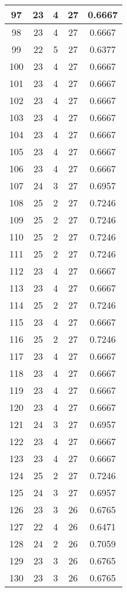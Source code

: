 \documentclass[letterpaper, 12pt]{article}
\begin{document}
\begin{longtable}{|c|c|c|c|c|}
\hline
97 & 23 & 4 & 27 & 0.6667 \\
\hline
98 & 23 & 4 & 27 & 0.6667 \\
\hline
99 & 22 & 5 & 27 & 0.6377 \\
\hline
100 & 23 & 4 & 27 & 0.6667 \\
\hline
101 & 23 & 4 & 27 & 0.6667 \\
\hline
102 & 23 & 4 & 27 & 0.6667 \\
\hline
103 & 23 & 4 & 27 & 0.6667 \\
\hline
104 & 23 & 4 & 27 & 0.6667 \\
\hline
105 & 23 & 4 & 27 & 0.6667 \\
\hline
106 & 23 & 4 & 27 & 0.6667 \\
\hline
107 & 24 & 3 & 27 & 0.6957 \\
\hline
108 & 25 & 2 & 27 & 0.7246 \\
\hline
109 & 25 & 2 & 27 & 0.7246 \\
\hline
110 & 25 & 2 & 27 & 0.7246 \\
\hline
111 & 25 & 2 & 27 & 0.7246 \\
\hline
112 & 23 & 4 & 27 & 0.6667 \\
\hline
113 & 23 & 4 & 27 & 0.6667 \\
\hline
114 & 25 & 2 & 27 & 0.7246 \\
\hline
115 & 23 & 4 & 27 & 0.6667 \\
\hline
116 & 25 & 2 & 27 & 0.7246 \\
\hline
117 & 23 & 4 & 27 & 0.6667 \\
\hline
118 & 23 & 4 & 27 & 0.6667 \\
\hline
119 & 23 & 4 & 27 & 0.6667 \\
\hline
120 & 23 & 4 & 27 & 0.6667 \\
\hline
121 & 24 & 3 & 27 & 0.6957 \\
\hline
122 & 23 & 4 & 27 & 0.6667 \\
\hline
123 & 23 & 4 & 27 & 0.6667 \\
\hline
124 & 25 & 2 & 27 & 0.7246 \\
\hline
125 & 24 & 3 & 27 & 0.6957 \\
\hline
126 & 23 & 3 & 26 & 0.6765 \\
\hline
127 & 22 & 4 & 26 & 0.6471 \\
\hline
128 & 24 & 2 & 26 & 0.7059 \\
\hline
129 & 23 & 3 & 26 & 0.6765 \\
\hline
130 & 23 & 3 & 26 & 0.6765 \\

\end{longtable}
\end{document}
